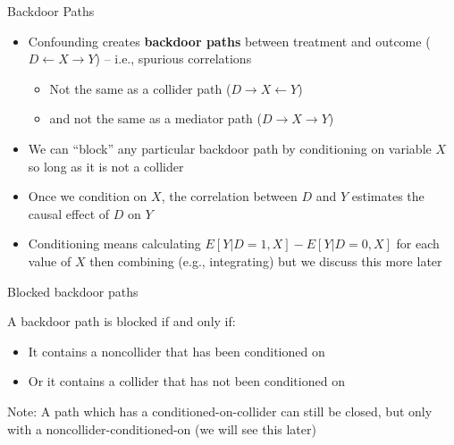 \documentclass{beamer}
\begin{document}
\begin{frame}{Backdoor Paths}

  \begin{itemize}
    \item Confounding creates \textbf{backdoor paths} between treatment and outcome ($D\leftarrow X\rightarrow Y$) -- i.e., spurious correlations
		\begin{itemize}
		\item Not the same as a collider path ($D \rightarrow X \leftarrow Y$)
		\item and not the same as a mediator path ($D \rightarrow X \rightarrow Y$)
		\end{itemize}
    \item We can ``block'' any particular backdoor path by conditioning on variable $X$ so long as it is not a collider
    \item Once we condition on $X$, the correlation between $D$ and $Y$ estimates the causal effect of $D$ on $Y$
    \item Conditioning means calculating $E[Y|D=1,X]-E[Y|D=0,X]$ for each value of $X$ then combining (e.g., integrating) but we discuss this more later

  \end{itemize}

  \begin{center}
  \end{center}

\end{frame}



\begin{frame}{Blocked backdoor paths}

  A backdoor path is blocked if and only if:
  \begin{itemize}
    \item It contains a noncollider that has been conditioned on
    \item Or it contains a collider that has not been conditioned on
  \end{itemize}
  
  \bigskip
  
Note: A path which has a conditioned-on-collider can still be closed, but only with a noncollider-conditioned-on (we will see this later)

\end{frame}
\end{document}
